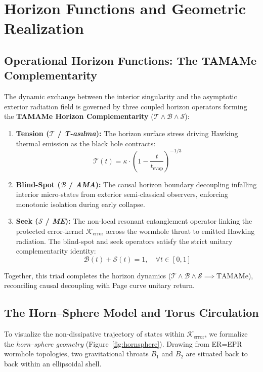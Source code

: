 \documentclass[11pt,a4paper]{article}
\newcommand{\T}{\mathcal{T}}
\newcommand{\B}{\mathcal{B}}
\newcommand{\Sk}{\mathcal{S}}
\newcommand{\Kerr}{\mathcal{K}_{\text{error}}}
\begin{document}
\section{Horizon Functions and Geometric Realization}\label{sec:geom}

\subsection{Operational Horizon Functions: The TAMAMe Complementarity}
The dynamic exchange between the interior singularity and the asymptotic exterior radiation field is governed by three coupled horizon operators forming the \textbf{TAMAMe Horizon Complementarity} ($\T \land \B \land \Sk$):
\begin{enumerate}[label=\arabic*.]
\item \textbf{Tension ($\T$ / \emph{T-as\i lma}):} The horizon surface stress driving Hawking thermal emission as the black hole contracts:
\begin{equation}
\T(t) = \kappa \cdot \left(1 - \frac{t}{t_{\text{evap}}}\right)^{-1/3}
\end{equation}
\item \textbf{Blind-Spot ($\B$ / \emph{AMA}):} The causal horizon boundary decoupling infalling interior micro-states from exterior semi-classical observers, enforcing monotonic isolation during early collapse.
\item \textbf{Seek ($\Sk$ / \emph{ME}):} The non-local resonant entanglement operator linking the protected error-kernel $\Kerr$ across the wormhole throat to emitted Hawking radiation. The blind-spot and seek operators satisfy the strict unitary complementarity identity:
\begin{equation}
\B(t) + \Sk(t) = 1, \quad \forall t \in [0, 1]
\end{equation}
\end{enumerate}
Together, this triad completes the horizon dynamics ($\T \land \B \land \Sk \implies \text{TAMAMe}$), reconciling causal decoupling with Page curve unitary return.

\subsection{The Horn--Sphere Model and Torus Circulation}\label{sec:hornsphere}
To visualize the non-dissipative trajectory of states within $\Kerr$, we formalize the \emph{horn--sphere geometry} (Figure~\ref{fig:hornsphere}). Drawing from ER=EPR wormhole topologies, two gravitational throats $B_1$ and $B_2$ are situated back to back within an ellipsoidal shell.
\end{document}
